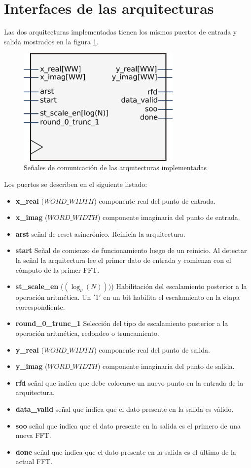 \section{Interfaces de las arquitecturas}

Las dos arquitecturas implementadas tienen los mismos puertos de entrada y salida mostrados en la
figura \ref{fig:arqInterf}. 

\begin{figure}[htb!]
        \centering
        \includegraphics[width=8cm]{./figures/arcInterf.png}
        \caption{Señales de comunicación de las arquitecturas implementadas}
        \label{fig:arqInterf}
\end{figure}

Los puertos se describen en el siguiente listado:

\begin{itemize}
  \item \textbf{x\_real} ($WORD\_WIDTH$) componente real del punto de entrada.
  \item \textbf{x\_imag} ($WORD\_WIDTH$) componente imaginaria del punto de entrada.
  \item \textbf{arst} señal de reset asincrónico. Reinicia la arquitectura.
  \item \textbf{start} Señal de comienzo de funcionamiento luego de un reinicio. Al detectar la
  señal la arquitectura lee el primer dato de entrada y comienza con el cómputo de la primer FFT.
  \item \textbf{st\_scale\_en} ($(\log_\nu(N)))$) Habilitación del escalamiento posterior a la
  operación aritmética. Un $'1'$ en un bit habilita el escalamiento en la etapa correspondiente.
  \item \textbf{round\_0\_trunc\_1} Selección del tipo de escalamiento posterior a la operación
  aritmética, redondeo o truncamiento.
  \item \textbf{y\_real} ($WORD\_WIDTH$) componente real del punto de salida.
  \item \textbf{y\_imag} ($WORD\_WIDTH$) componente imaginaria del punto de salida.
  \item \textbf{rfd} señal que indica que debe colocarse un nuevo punto en la entrada de la
  arquitectura.
  \item \textbf{data\_valid} señal que indica que el dato presente en la salida es válido.
  \item \textbf{soo} señal que indica que el dato presente en la salida es el primero de una nueva
  FFT.
  \item \textbf{done} señal que indica que el dato presente en la salida es el último de la actual
  FFT.
\end{itemize}

